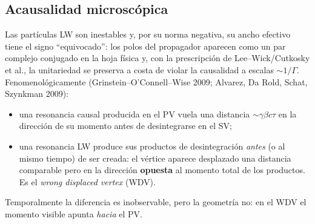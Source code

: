\documentclass[11pt,a4paper]{article}
\begin{document}
\subsection{Acausalidad microscópica}
Las partículas LW son inestables y, por su norma negativa, su ancho efectivo tiene el signo ``equivocado'': los polos del propagador aparecen como un par complejo conjugado en la hoja física y, con la prescripción de Lee--Wick/Cutkosky et al., la unitariedad se preserva a costa de violar la causalidad a escalas $\sim 1/\Gamma$. Fenomenológicamente (Grinstein--O'Connell--Wise 2009; Alvarez, Da Rold, Schat, Szynkman 2009):
\begin{itemize}
\item una resonancia causal producida en el PV vuela una distancia $\sim\gamma\beta c\tau$ en la dirección de su momento antes de desintegrarse en el SV;
\item una resonancia LW produce sus productos de desintegración \emph{antes} (o al mismo tiempo) de ser creada: el vértice aparece desplazado una distancia comparable pero en la dirección \textbf{opuesta} al momento total de los productos. Es el \emph{wrong displaced vertex} (WDV).
\end{itemize}
Temporalmente la diferencia es inobservable, pero la geometría no: en el WDV el momento visible apunta \emph{hacia} el PV.
\end{document}
